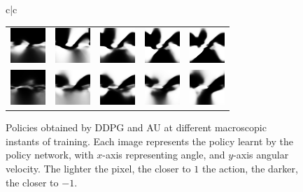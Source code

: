 \begin{figure}[!ht]
\begin{tabular}{c|c}
\begin{tabular}{lllll}
			\includegraphics[width=\iw]{figs_data/pendulum/0.001/au_act_20.png} &\includegraphics[width=\iw]{figs_data/pendulum/0.001/au_act_40.png} &\includegraphics[width=\iw]{figs_data/pendulum/0.001/au_act_60.png} &\includegraphics[width=\iw]{figs_data/pendulum/0.001/au_act_80.png} &\includegraphics[width=\iw]{figs_data/pendulum/0.001/au_act_100.png} \\
			\includegraphics[width=\iw]{figs_data/pendulum/0.0005/au_act_40.png} &\includegraphics[width=\iw]{figs_data/pendulum/0.0005/au_act_80.png} &\includegraphics[width=\iw]{figs_data/pendulum/0.0005/au_act_120.png} &\includegraphics[width=\iw]{figs_data/pendulum/0.0005/au_act_160.png} &\includegraphics[width=\iw]{figs_data/pendulum/0.0005/au_act_200.png}
		\end{tabular}
	\end{tabular}
	\caption{Policies obtained by DDPG and AU at different macroscopic instants of training. Each image represents the policy learnt by the policy network, with $x$-axis representing angle, and $y$-axis angular velocity. The lighter the pixel, the closer to $1$ the action, the darker, the closer to $-1$.}
\end{figure}
